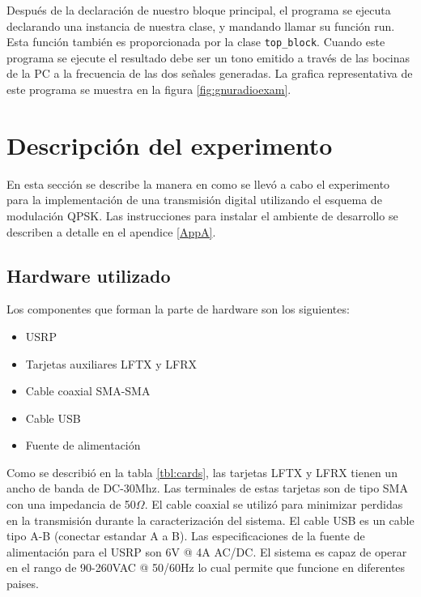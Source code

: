 Despu\'es de la declaraci\'on de nuestro bloque principal, el programa se
ejecuta declarando una instancia de nuestra clase, y mandando llamar su
funci\'on run. Esta funci\'on tambi\'en es proporcionada por la clase
\verb|top_block|. Cuando este programa se ejecute el resultado debe ser un tono
emitido a trav\'es de las bocinas de la PC a la frecuencia de las dos se\~nales
generadas. La grafica representativa de este programa se muestra en la figura
\ref{fig:gnuradioexam}.

\section{Descripci\'on del experimento}
En esta secci\'on se describe la manera en como se llev\'o a cabo el experimento para la
implementaci\'on de una transmisi\'on digital utilizando el esquema de modulaci\'on QPSK. Las
instrucciones para instalar el ambiente de desarrollo se describen a detalle en el apendice
\ref{AppA}.

\subsection{Hardware utilizado}
Los componentes que forman la parte de hardware son los siguientes:

\begin{itemize}
  \item USRP
  \item Tarjetas auxiliares LFTX y LFRX
  \item Cable coaxial SMA-SMA
  \item Cable USB
  \item Fuente de alimentaci\'on
\end{itemize} 

Como se describi\'o en la tabla \ref{tbl:cards}, las tarjetas LFTX y LFRX tienen un ancho de banda
de DC-30Mhz. Las terminales de estas tarjetas son de tipo SMA con una impedancia de 50$\Omega$. El
cable coaxial se utiliz\'o para minimizar perdidas en la transmisi\'on durante la caracterizaci\'on
del sistema. El cable USB es un cable tipo A-B (conectar estandar A a B). Las especificaciones de la
fuente de alimentaci\'on para el USRP son 6V @ 4A AC/DC. El sistema es capaz de operar en el rango
de 90-260VAC @ 50/60Hz lo cual permite que funcione en diferentes paises.


